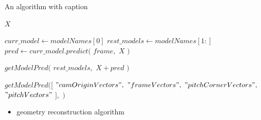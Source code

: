 \documentclass[
11pt,
twoside
]{report}
\begin{document}
\begin{algorithm}
\begin{algorithmic}


\caption{An algorithm with caption}\label{alg:cap}


\State


        \State
        \Return $X$
    \EndIf

    \State $curr\_model \gets modelNames[0]$
    \State $rest\_models \gets modelNames[1:]$
    \State $pred \gets curr\_model.predict($
            \State \indent $frame,$
            \State \indent $X$
    \State $)$


    \Return $getModelPred($
        \State \indent $rest\_models,$
        \State \indent $X + pred$
    \State $)$


\EndProcedure

\State
\State


    \State
    \Return $getModelPred([$
        \State \indent $"camOriginVectors",$
        \State \indent $"frameVectors",$
        \State \indent $"pitchCornerVectors",$
        \State \indent $"pitchVectors"$
        \State \indent $],$
        \State \indent \emptyset
        \State
    \State $)$

\EndProcedure


\end{algorithmic}
\end{algorithm}




\begin{itemize}
\item
  geometry reconstruction algorithm
\end{itemize}
\end{document}
